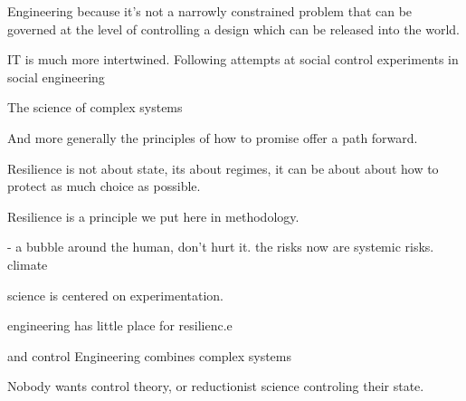 Engineering
because it's not a narrowly constrained problem that can be governed at the level of controlling a design which can be released into the world. 

IT is much more intertwined.
Following attempts at social control
experiments in social engineering

The science of complex systems


And more generally the principles of how to promise offer a path forward. 

Resilience is not about state, its about regimes, it can be about about how to protect as much choice as possible.

Resilience is a principle we put here in methodology. 




- a bubble around the human, don't hurt it.
the risks now are systemic risks.
climate

science is centered on experimentation.


engineering has little place for resilienc.e

and control
Engineering combines 
complex systems

Nobody wants control theory, or reductionist science controling their state.